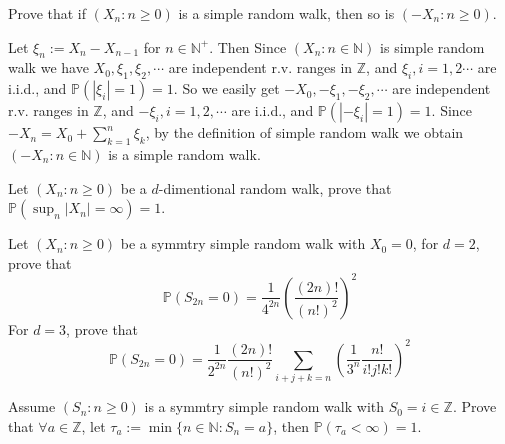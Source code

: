\documentclass{ctexart}
\newif\ifpreface
\begin{document}
\large
\setlength{\baselineskip}{1.2em}
\ifpreface
	
\else
	\maketitle
\fi
{}

\begin{problem}\label{pro:1}
	Prove that if \((X_n:n \geq 0)\) is a simple random walk, then so is \((-X_n:n \geq 0)\).
\end{problem}

\begin{solution}
	Let \(\xi_n:=X_n-X_{n-1}\) for \(n \in \mathbb{N}^+\). Then Since \((X_n:n \in \mathbb{N})\) is simple random walk we have
	\(X_0,\xi_1,\xi_2,\cdots\) are independent r.v. ranges in \(\mathbb{Z}\), and
	\(\xi_i,i=1,2\cdots\) are i.i.d., and \(\mathbb{P}(|\xi_i|=1)=1\).
	So we easily get \(-X_0,-\xi_1,-\xi_2,\cdots\) are independent r.v. ranges in \(\mathbb{Z}\),
	and \(-\xi_i,i=1,2,\cdots\) are i.i.d., and \(\mathbb{P}(|-\xi_i|=1)=1\).
	Since \(-X_n=X_0+\sum_{k=1}^{n}\xi_k\), by the definition of simple random walk we obtain \((-X_n:n \in \mathbb{N})\) is a simple random walk.
\end{solution}

\begin{problem}\label{pro:2}
	Let \((X_n:n \geq 0)\) be a \(d\)-dimentional random walk, prove that \(\mathbb{P}(\sup_{n}|X_n|=\infty)=1\).
\end{problem}

\begin{problem}\label{pro:3}
	Let \((X_n:n \geq 0)\) be a symmtry simple random walk with \(X_0=0\), for \(d=2\), prove that
	\[
		\mathbb{P}(S_{2n}=0)=\frac{1}{4^{2n}}\left(\frac{(2n)!}{(n!)^2}\right)^2
	\]
	For \(d=3\), prove that
	\[
		\mathbb{P}(S_{2n}=0)=\frac{1}{2^{2n}}\frac{(2n)!}{(n!)^2}\sum_{i + j + k = n} \left(\frac{1}{3^n}\frac{n!}{i!j!k!}\right)^2
	\]
\end{problem}

\begin{problem}\label{pro:4}
	Assume \((S_n:n \geq 0)\) is a symmtry simple random walk with \(S_0 = i \in \mathbb{Z}\).
	Prove that \(\forall a \in \mathbb{Z}\), let \(\tau_a:=\min\{n \in \mathbb{N}:S_n=a \}\), then \(\mathbb{P}(\tau_a < \infty) = 1 \).
\end{problem}
\end{document}
